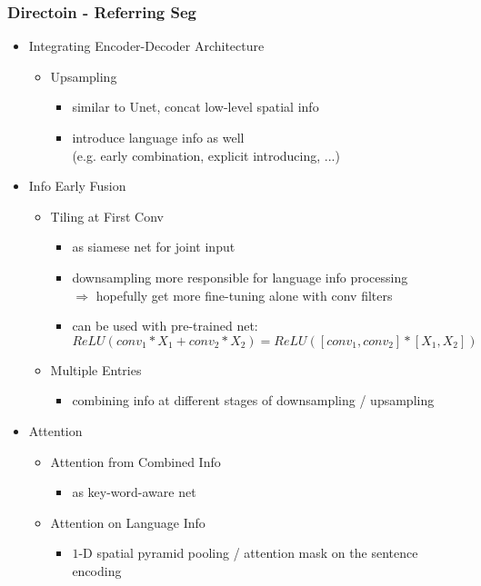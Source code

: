 \subsubsection{Directoin - Referring Seg}
\begin{itemize}
\item Integrating Encoder-Decoder Architecture
	\begin{itemize}
	\item Upsampling
		\begin{itemize}
		\item similar to Unet, concat low-level spatial info
		\item introduce language info as well \\
		(e.g. early combination, explicit introducing, ...)
		\end{itemize}
	\end{itemize}
\item Info Early Fusion
	\begin{itemize}
	\item Tiling at First Conv
		\begin{itemize}
		\item as siamese net for joint input
		\item downsampling more responsible for language info processing \\
		$\Rightarrow$ hopefully get more fine-tuning alone with conv filters
		\item can be used with pre-trained net: \\ 
		$ReLU(conv_1*X_1 + conv_2*X_2) = ReLU( [conv_1,conv_2]*[X_1,X_2] )$
		\end{itemize}
	\item Multiple Entries
		\begin{itemize}
		\item combining info at different stages of downsampling / upsampling
		\end{itemize}
	\end{itemize}
\item Attention
	\begin{itemize}
	\item Attention from Combined Info
		\begin{itemize}
		\item as key-word-aware net
		\end{itemize}
	\item Attention on Language Info
		\begin{itemize}
		\item $1$-D spatial pyramid pooling / attention mask on the sentence encoding

\end{itemize}
\end{itemize}
\end{itemize}
